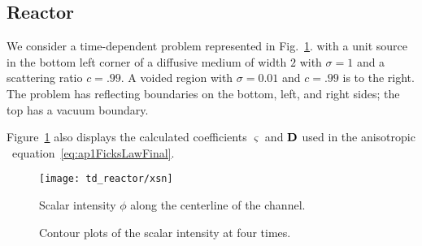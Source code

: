 \subsection{Reactor}

We consider a time-dependent problem represented in
Fig.~\ref{fig:tdReactorProblem}.
with a unit source in the bottom left corner of a diffusive medium of width
$2$ with $\sigma=1$ and a scattering ratio $c=.99$. A voided region with
$\sigma=0.01$ and $c=.99$ is to the right. The problem has reflecting boundaries
on the bottom, left, and right sides; the top has a vacuum boundary.

Figure~\ref{fig:tdReactorProblem} also displays the calculated coefficients
$\varsigma$ and $\mathbf{D}$ used in the anisotropic \Pone\
equation~\eqref{eq:ap1FicksLawFinal}.

\begin{figure}[bp]
  \centering
  \texttt{[image: td\_reactor/xsn]}
  \label{fig:tdReactorProblem}
\end{figure}

\begin{figure}[htb]
  \centering\small
  \subfloat[$t=2$]{%
    }%
  \subfloat[$t=5$]{%
    }

  \subfloat[$t=10$]{%
    }%
  \subfloat[$t=15$]{%
    }

  \caption{Scalar intensity $\phi$ along the centerline of the channel.}
  \label{fig:tdReactor}
\end{figure}

\begin{figure}[htb]
  \centering\small


  \caption{Contour plots of the scalar intensity at four times.}
  \label{fig:tdReactorContour}
\end{figure}

